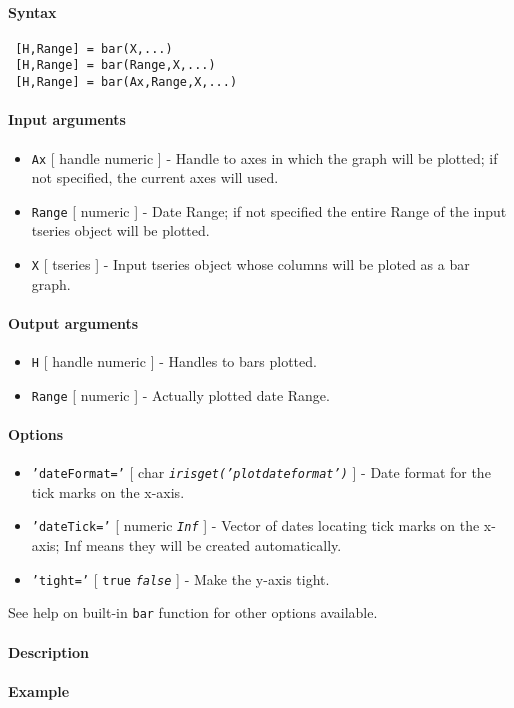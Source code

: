 


	\paragraph{Syntax}
 
 \begin{verbatim}
 [H,Range] = bar(X,...)
 [H,Range] = bar(Range,X,...)
 [H,Range] = bar(Ax,Range,X,...)
 \end{verbatim}
 
 \paragraph{Input arguments}
 
 \begin{itemize}
 \item
   \texttt{Ax} {[} handle \textbar{} numeric {]} - Handle to axes in
   which the graph will be plotted; if not specified, the current axes
   will used.
 \item
   \texttt{Range} {[} numeric {]} - Date Range; if not specified the
   entire Range of the input tseries object will be plotted.
 \item
   \texttt{X} {[} tseries {]} - Input tseries object whose columns will
   be ploted as a bar graph.
 \end{itemize}
 
 \paragraph{Output arguments}
 
 \begin{itemize}
 \item
   \texttt{H} {[} handle \textbar{} numeric {]} - Handles to bars
   plotted.
 \item
   \texttt{Range} {[} numeric {]} - Actually plotted date Range.
 \end{itemize}
 
 \paragraph{Options}
 
 \begin{itemize}
 \item
   \texttt{'dateFormat='} {[} char \textbar{}
   \emph{\texttt{irisget('plotdateformat')}} {]} - Date format for the
   tick marks on the x-axis.
 \item
   \texttt{'dateTick='} {[} numeric \textbar{} \emph{\texttt{Inf}} {]} -
   Vector of dates locating tick marks on the x-axis; Inf means they will
   be created automatically.
 \item
   \texttt{'tight='} {[} \texttt{true} \textbar{} \emph{\texttt{false}}
   {]} - Make the y-axis tight.
 \end{itemize}
 
 See help on built-in \texttt{bar} function for other options available.
 
 \paragraph{Description}
 
 \paragraph{Example}


